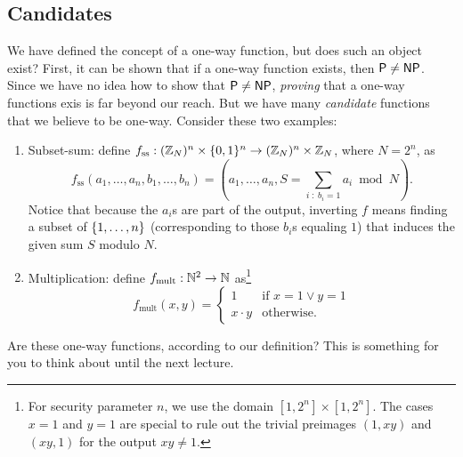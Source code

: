 \documentclass[11pt]{article}
\begin{document}
\subsection{Candidates}
\label{sec:candidates}

We have defined the concept of a one-way function, but does such an
object exist?  First, it can be shown that if a one-way function
exists, then $\mathsf{P} \neq \mathsf{NP}$.  Since we have no idea how to show that
$\mathsf{P} \neq \mathsf{NP}$, \emph{proving} that a one-way functions exis is far
beyond our reach.  But we have many \emph{candidate} functions that we
believe to be one-way.  Consider these two examples:
\begin{enumerate}
\item Subset-sum: define $f_{\text{ss}} : (\mathbb{Z}_{N})^{n} \times \{0,1\}^{n}
  \to (\mathbb{Z}_{N})^{n} \times \mathbb{Z}_{N}$, where $N = 2^{n}$, as \[
  f_{\text{ss}}(a_{1}, \ldots, a_{n}, b_{1}, \ldots, b_{n}) = (a_{1},
  \ldots, a_{n}, S = \sum_{i\; :\; b_{i} = 1} a_{i} \bmod N). \]
  Notice that because the $a_{i}$s are part of the output, inverting
  $f$ means finding a subset of $\{1,\ldots,n\}$ (corresponding to
  those $b_{i}$s equaling $1$) that induces the given sum $S$ modulo
  $N$.
\item Multiplication: define $f_{\text{mult}} : \mathbb{N}^{2} \to \mathbb{N}$
  as\footnote{For security parameter $n$, we use the domain $[1,2^{n}]
    \times [1,2^{n}]$.  The cases $x=1$ and $y=1$ are special to rule
    out the trivial preimages $(1,xy)$ and $(xy, 1)$ for the output
    $xy \neq 1$.}
  \[
  f_{\text{mult}}(x,y) =
  \begin{cases}
    1 & \text{if } x=1 \vee y=1 \\
    x \cdot y & \text{otherwise.}
  \end{cases}
  \]
\end{enumerate}

Are these one-way functions, according to our definition?  This is
something for you to think about until the next lecture.
\end{document}
